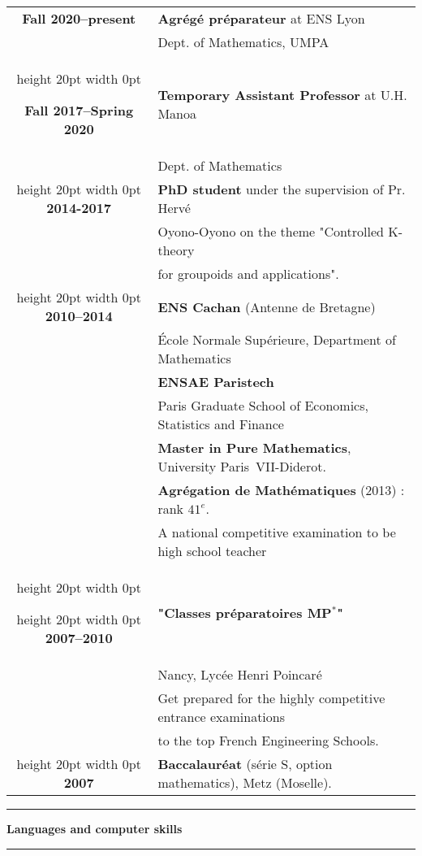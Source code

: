 \documentclass[a4paper,11pt]{article}
\newcommand\espace{\vrule height 20pt width 0pt}
\newcommand{\titre}[1]{%
	\begin{center}
	\bigskip
	\rule{\textwidth}{1pt}
	\par\vspace{0.1cm}
        \textbf{\large #1}
	\par\rule{\textwidth}{1pt}
	\end{center}
	\bigskip
	}
\begin{document}
\begin{tabular}{cp{}}

\textbf{Fall 2020--present} &  \textbf{Agr\'eg\'e pr\'eparateur} at ENS Lyon \\
						& Dept. of Mathematics, UMPA\\

\espace

\textbf{Fall 2017--Spring 2020} &  \textbf{Temporary Assistant Professor} at U.H. Manoa  \\
						& Dept. of Mathematics\\
\espace
\textbf{2014-2017} &  \textbf{PhD student} under the supervision of Pr. Hervé  \\
						& Oyono-Oyono on the theme "Controlled K-theory \\
						& for groupoids and applications". \\
\espace
\textbf{2010--2014} &  \textbf{ENS Cachan} (Antenne de Bretagne) \\
				    & \'Ecole Normale Supérieure, Department of Mathematics \\
                              & \textbf{ENSAE Paristech}\\
				&	Paris Graduate School of Economics, Statistics and Finance\\
                                   & \textbf{Master in Pure Mathematics}, University Paris~VII-Diderot. \\
                                   & \textbf{Agrégation de Mathématiques} (2013) : rank $41^e$. \\
				& A national competitive examination to be high school teacher\\
\espace

\espace
\textbf{2007--2010} &\textbf{ "Classes préparatoires MP$^*$" } \\
					& Nancy, Lycée Henri Poincaré\\
					& Get prepared for the highly competitive entrance examinations\\
				& to the top French Engineering Schools.\\

\espace
\textbf{2007} & \textbf{Baccalauréat} (série S, option mathematics), Metz (Moselle). 
 \\

\end{tabular}

\newpage
\titre{Languages and computer skills}
\end{document}
